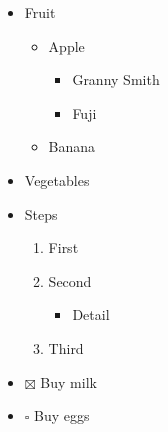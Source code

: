 \begin{itemize}\item Fruit

\begin{itemize}\item Apple

\begin{itemize}\item Granny Smith



\item Fuji



\end{itemize}

\item Banana



\end{itemize}

\item Vegetables



\item Steps

\begin{enumerate}\item First



\item Second

\begin{itemize}\item Detail



\end{itemize}

\item Third



\end{enumerate}

\item $\boxtimes$ Buy milk



\item $\square$ Buy eggs



\end{itemize}